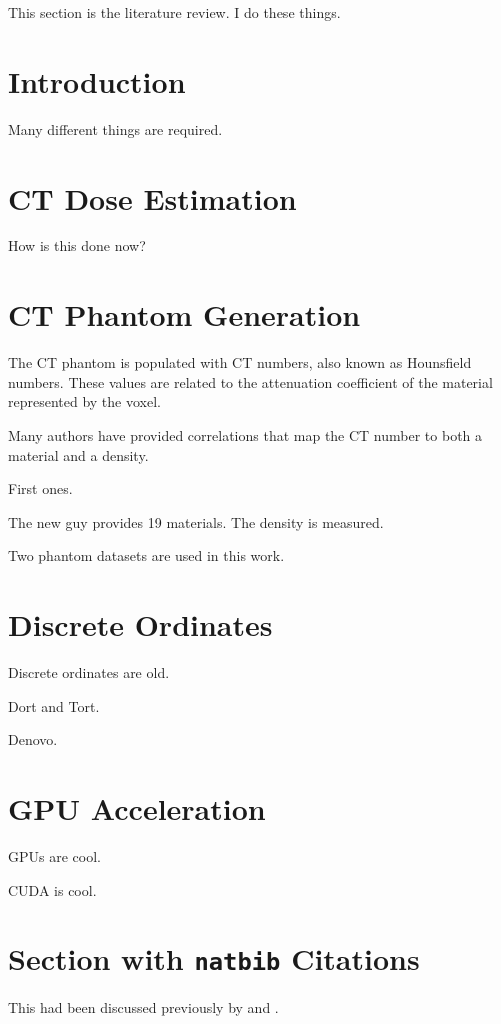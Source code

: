 


This section is the literature review. I do these things.

\section{Introduction}
Many different things are required.

\section{CT Dose Estimation}
How is this done now?

\section{CT Phantom Generation}
The CT phantom is populated with CT numbers, also known as Hounsfield numbers. These values are related to the attenuation coefficient of the material represented by the voxel.

Many authors have provided correlations that map the CT number to both a material and a density.

First ones.

The new guy provides 19 materials. The density is measured.

Two phantom datasets are used in this work.

\section{Discrete Ordinates}
Discrete ordinates are old.

Dort and Tort.

Denovo.

\section{GPU Acceleration}
GPUs are cool.

CUDA is cool.


\section{Section with \texttt{natbib} Citations}

This had been discussed previously by \citep{bullwinkle.1990} and
\citet{bullwinkle.1991}. \lipsum[22-25]


\endinput
